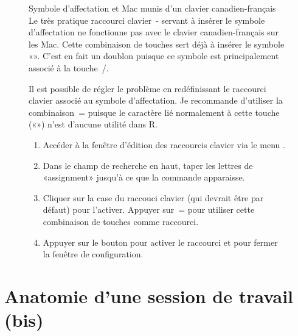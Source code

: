 \begin{figure}[t]
  \label{fig:rstudio:affectation}
  \begin{titled-frame}{Symbole d'affectation et
      Mac munis d'un clavier canadien-français}
    Le très pratique raccourci clavier {\optkey\,-} servant à insérer
    le symbole d'affectation ne fonctionne pas avec le clavier
    canadien-français sur les Mac. Cette combinaison de touches sert
    déjà à insérer le symbole «\textbar». C'est en fait un doublon
    puisque ce symbole est principalement associé à la touche
    {\optkey\,/}.

    Il est possible de régler le problème en redéfinissant le
    raccourci clavier associé au symbole d'affectation. Je recommande
    d'utiliser la combinaison {\optkey\,=} puisque le caractère lié
    normalement à cette touche («») n'est d'aucune utilité dans
    R.

    \begin{enumerate}
    \item Accéder à la fenêtre d'édition des raccourcis clavier via le
      menu .
    \item Dans le champ de recherche en haut, taper les lettres de
      «assignment» jusqu'à ce que la commande  apparaisse.
    \item Cliquer sur la case du raccouci clavier (qui devrait être
       par défaut) pour l'activer. Appuyer sur \optkey\,=
      pour utiliser cette combinaison de touches comme raccourci.
    \item Appuyer sur le bouton  pour activer le raccourci
      et pour fermer la fenêtre de configuration.
    \end{enumerate}

  \end{titled-frame}
\end{figure}


\section{Anatomie d'une session de travail (bis)}
\label{sec:rstudio:session}

